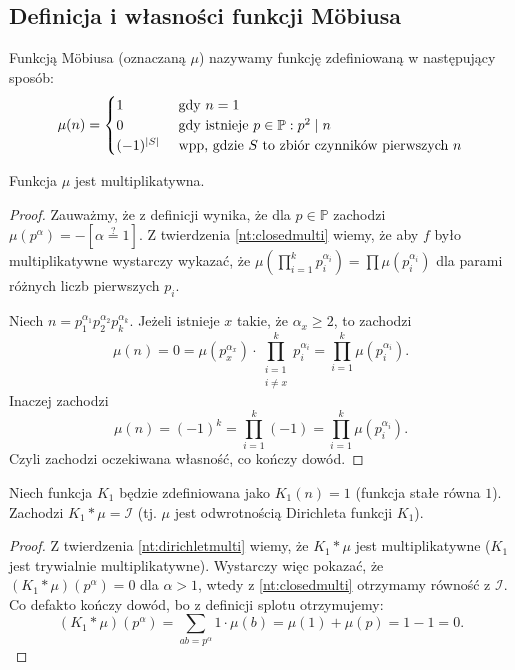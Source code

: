 \subsection{Definicja i własności funkcji Möbiusa}
\begin{definition}
	Funkcją Möbiusa (oznaczaną \(\mu\)) nazywamy funkcję
	zdefiniowaną w następujący sposób:
	\begin{equation*}
		\mu(n) = \begin{cases}
			1               & \text{ gdy } n = 1                                      \\
			0               & \text{ gdy istnieje } p \in \mathbb P: p^2 \mid n       \\
			(-1)^{\card{S}} & \text{ wpp, gdzie $S$ to zbiór czynników pierwszych } n
		\end{cases}
	\end{equation*}
\end{definition}

\begin{fact}
	Funkcja \(\mu\) jest multiplikatywna.
\end{fact}
\begin{proof}
	Zauważmy, że z definicji wynika, że dla \(p \in \mathbb P\) zachodzi
	\(\mu(p^{\alpha}) = -[\alpha \stackrel{?}{=} 1]\).
	Z twierdzenia \ref{nt:closedmulti}
	wiemy, że aby \(f\) było multiplikatywne wystarczy wykazać, że
	\(\mu(\prod_{i=1}^{k} p_i^{\alpha_i}) = \prod \mu(p_i^{\alpha_i})\)
	dla parami różnych liczb pierwszych \(p_i\).

	Niech \(n = p_1^{\alpha_1}p_2^{\alpha_2}p_k^{\alpha_k}\).
	Jeżeli istnieje \(x\) takie, że \(\alpha_x \geq 2\), to
	zachodzi \[\mu(n) = 0 = \mu(p_x^{\alpha_x}) \cdot \prod_{\substack{i = 1 \\ i \neq x}}^k p_i^{\alpha_i} = \prod_{i=1}^{k} \mu(p_i^{\alpha_i}).\]
	Inaczej zachodzi \[\mu(n) = (-1)^{k} = \prod_{i=1}^{k} (-1) = \prod_{i=1}^{k} \mu(p_i^{\alpha_i}).\]
	Czyli zachodzi oczekiwana własność, co kończy dowód.
\end{proof}

\begin{theorem}
	Niech funkcja \(K_1\) będzie zdefiniowana jako \(K_1(n) = 1\)
	(funkcja stałe równa \(1\)). Zachodzi \(K_1 * \mu = \mathcal I\)
	(tj. \(\mu\) jest odwrotnością Dirichleta funkcji \(K_1\)).
\end{theorem}
\begin{proof}
	Z twierdzenia \ref{nt:dirichletmulti}
	wiemy, że \(K_1 * \mu\) jest multiplikatywne (\(K_1\) jest trywialnie multiplikatywne).
	Wystarczy więc pokazać, że \((K_1 * \mu)(p^\alpha) = 0\) dla \(\alpha > 1\), wtedy z \ref{nt:closedmulti}
	otrzymamy równość z \(\mathcal I\). Co defakto kończy dowód, bo z definicji splotu otrzymujemy:
	\[(K_1 * \mu)(p^\alpha) = \sum_{ab = p^\alpha} 1 \cdot \mu(b) = \mu(1) + \mu(p) = 1 - 1 = 0.\]
\end{proof}

